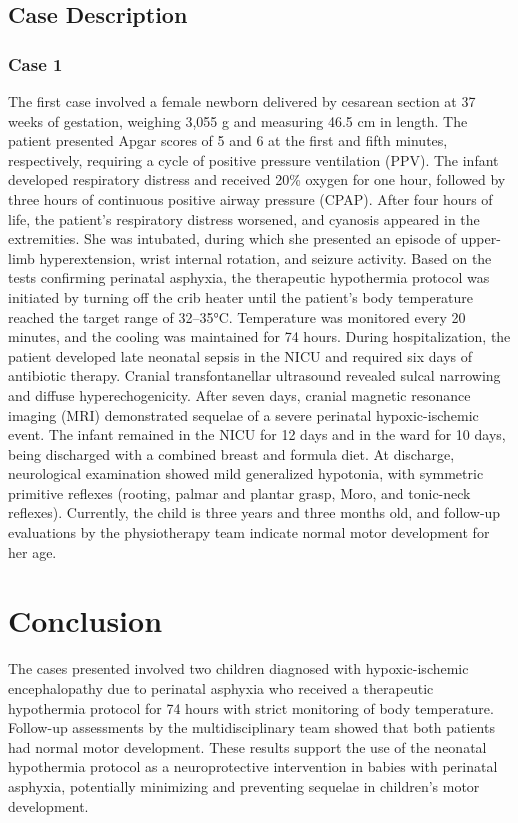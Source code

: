 \documentclass[11pt,a4paper]{article}
\begin{document}
	\subsection{Case Description}
	\subsubsection{Case 1}
	The first case involved a female newborn delivered by cesarean section at 37 weeks of gestation, weighing 3,055 g and measuring 46.5 cm in length. The patient presented Apgar scores of 5 and 6 at the first and fifth minutes, respectively, requiring a cycle of positive pressure ventilation (PPV). The infant developed respiratory distress and received 20\% oxygen for one hour, followed by three hours of continuous positive airway pressure (CPAP).
	After four hours of life, the patient’s respiratory distress worsened, and cyanosis appeared in the extremities. She was intubated, during which she presented an episode of upper-limb hyperextension, wrist internal rotation, and seizure activity. Based on the tests confirming perinatal asphyxia, the therapeutic hypothermia protocol was initiated by turning off the crib heater until the patient’s body temperature reached the target range of 32–35°C. Temperature was monitored every 20 minutes, and the cooling was maintained for 74 hours.
	During hospitalization, the patient developed late neonatal sepsis in the NICU and required six days of antibiotic therapy. Cranial transfontanellar ultrasound revealed sulcal narrowing and diffuse hyperechogenicity. After seven days, cranial magnetic resonance imaging (MRI) demonstrated sequelae of a severe perinatal hypoxic-ischemic event. The infant remained in the NICU for 12 days and in the ward for 10 days, being discharged with a combined breast and formula diet.
	At discharge, neurological examination showed mild generalized hypotonia, with symmetric primitive reflexes (rooting, palmar and plantar grasp, Moro, and tonic-neck reflexes). Currently, the child is three years and three months old, and follow-up evaluations by the physiotherapy team indicate normal motor development for her age.
		
	\section{Conclusion}
	The cases presented involved two children diagnosed with hypoxic-ischemic encephalopathy due to perinatal asphyxia who received a therapeutic hypothermia protocol for 74 hours with strict monitoring of body temperature. Follow-up assessments by the multidisciplinary team showed that both patients had normal motor development. These results support the use of the neonatal hypothermia protocol as a neuroprotective intervention in babies with perinatal asphyxia, potentially minimizing and preventing sequelae in children's motor development.
	
	\newpage
	
	\printbibliography[title=References]
		
\end{document}
